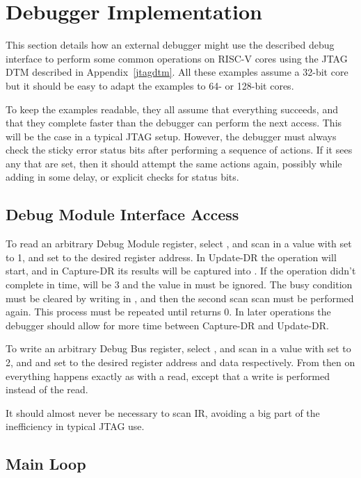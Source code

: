 \chapter{Debugger Implementation}

This section details how an external debugger might use the described debug
interface to perform some common operations on RISC-V cores using the JTAG DTM
described in Appendix~\ref{jtagdtm}.
All these examples assume a 32-bit core but it should be easy to adapt the
examples to 64- or 128-bit cores.

To keep the examples readable, they all assume that everything succeeds, and
that they complete faster than the debugger can perform the next access. This
will be the case in a typical JTAG setup. However, the debugger must always
check the sticky error status bits after performing a sequence of actions. If
it sees any that are set, then it should attempt the same actions again,
possibly while adding in some delay, or explicit checks for status bits.

\section{Debug Module Interface Access} \label{dmiaccess}

To read an arbitrary Debug Module register, select \Rdmi, and scan in a value
with \Fop set to 1, and \Faddress set to the desired register address. In
Update-DR the operation will start, and in Capture-DR its results will be
captured into \Fdata.  If the operation didn't complete in time, \Fop will be 3
and the value in \Fdata must be ignored. The busy condition must be cleared by
writing \Fdmireset in \Rdtmcs, and then the second scan scan must be performed again.
This process must be repeated until \Fop returns 0.
In later operations the debugger should allow for more time between Capture-DR and
Update-DR.

To write an arbitrary Debug Bus register, select \Rdmi, and scan in a value
with \Fop set to 2, and \Faddress and \Fdata set to the desired register
address and data respectively. From then on everything happens exactly as with
a read, except that a write is performed instead of the read.

It should almost never be necessary to scan IR, avoiding a big part of the
inefficiency in typical JTAG use.

\section{Main Loop}

